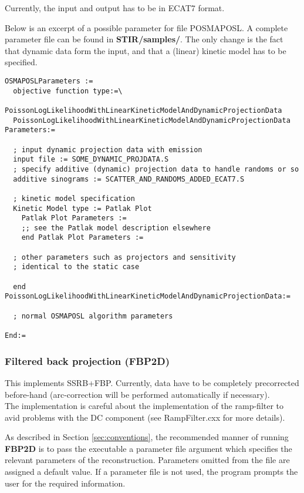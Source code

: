 \documentclass{article}
\begin{document}
{Currently, the input and output has to be in ECAT7 format. 

Below is an excerpt of a possible parameter for file POSMAPOSL. A complete parameter file
can be found in \textbf{STIR/samples/}. The only change is the fact that dynamic data
form the input, and that a (linear) kinetic model has to be specified.

\begin{verbatim}
OSMAPOSLParameters :=
  objective function type:=\
     PoissonLogLikelihoodWithLinearKineticModelAndDynamicProjectionData
  PoissonLogLikelihoodWithLinearKineticModelAndDynamicProjectionData Parameters:=

  ; input dynamic projection data with emission
  input file := SOME_DYNAMIC_PROJDATA.S
  ; specify additive (dynamic) projection data to handle randoms or so
  additive sinograms := SCATTER_AND_RANDOMS_ADDED_ECAT7.S

  ; kinetic model specification
  Kinetic Model type := Patlak Plot
    Patlak Plot Parameters :=
    ;; see the Patlak model description elsewhere
    end Patlak Plot Parameters :=

  ; other parameters such as projectors and sensitivity 
  ; identical to the static case

  end PoissonLogLikelihoodWithLinearKineticModelAndDynamicProjectionData:=

  ; normal OSMAPOSL algorithm parameters 

End:=
\end{verbatim}

\subsubsection{
Filtered back projection (FBP2D)}

This implements SSRB+FBP. Currently, data have to be completely 
precorrected before-hand (arc-correction will be performed automatically
if necessary).\\
The implementation is careful about the implementation of the 
ramp-filter to avid problems with the DC component (see RampFilter.cxx 
for more details).



As described in Section \ref{sec:conventions}, the recommended manner of running \textbf{FBP2D}  
is to pass the executable a parameter file argument which specifies 
the relevant parameters of the reconstruction. Parameters omitted 
from the file are assigned a default value. If a parameter file 
is not used, the program prompts the user for the required information.


}
\end{document}
